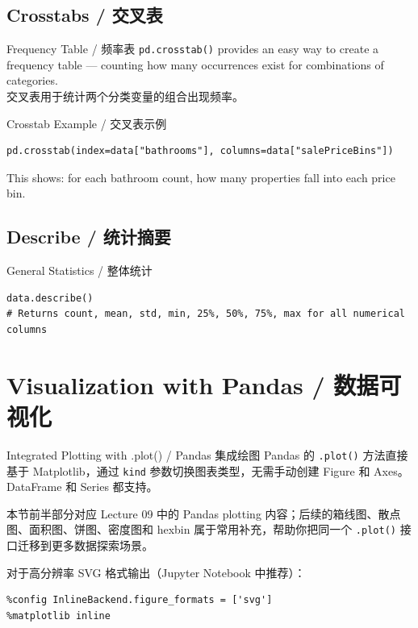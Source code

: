 \documentclass[11pt,a4paper]{report}
\let\oldtexttt\texttt
\renewcommand{\texttt}[1]{\textcolor{mainblue}{\oldtexttt{#1}}}
\begin{document}
\subsection{Crosstabs / 交叉表}

\begin{concept}{Frequency Table / 频率表}
    \texttt{pd.crosstab()} provides an easy way to create a frequency table — counting how many occurrences exist for combinations of categories. \\
    交叉表用于统计两个分类变量的组合出现频率。
\end{concept}

\begin{examplebox}{Crosstab Example / 交叉表示例}
\begin{lstlisting}
pd.crosstab(index=data["bathrooms"], columns=data["salePriceBins"])
\end{lstlisting}
    This shows: for each bathroom count, how many properties fall into each price bin.
\end{examplebox}

\subsection{Describe / 统计摘要}

\begin{examplebox}{General Statistics / 整体统计}
\begin{lstlisting}
data.describe()
# Returns count, mean, std, min, 25%, 50%, 75%, max for all numerical columns
\end{lstlisting}
\end{examplebox}

\section{Visualization with Pandas / 数据可视化}

\begin{concept}{Integrated Plotting with .plot() / Pandas 集成绘图}
    Pandas 的 \texttt{.plot()} 方法直接基于 Matplotlib，通过 \texttt{kind} 参数切换图表类型，无需手动创建 Figure 和 Axes。DataFrame 和 Series 都支持。

    本节前半部分对应 Lecture 09 中的 Pandas plotting 内容；后续的箱线图、散点图、面积图、饼图、密度图和 hexbin 属于常用补充，帮助你把同一个 \texttt{.plot()} 接口迁移到更多数据探索场景。

    对于高分辨率 SVG 格式输出（Jupyter Notebook 中推荐）：
\begin{lstlisting}
%config InlineBackend.figure_formats = ['svg']
%matplotlib inline
\end{lstlisting}
\end{concept}
\end{document}
